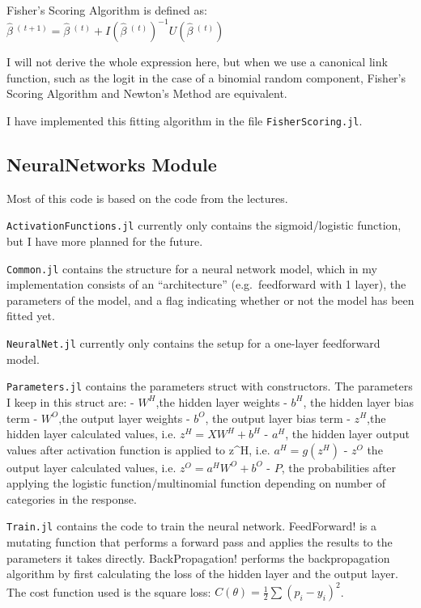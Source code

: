 \documentclass[]{article}
\begin{document}
Fisher's Scoring Algorithm is defined as:
\(\hat{\beta}\ ^{(\ t + 1)} = \hat{\beta}\ ^{(\ t)} +I(\hat{\beta}\ ^{(\ t)})^{-1}U(\hat{\beta}\ ^{(\ t)})\)

I will not derive the whole expression here, but when we use a canonical
link function, such as the logit in the case of a binomial random
component, Fisher's Scoring Algorithm and Newton's Method are
equivalent.

I have implemented this fitting algorithm in the file
\texttt{FisherScoring.jl}.

\subsection{NeuralNetworks Module}\label{neuralnetworks-module}

Most of this code is based on the code from the lectures.

\texttt{ActivationFunctions.jl} currently only contains the
sigmoid/logistic function, but I have more planned for the future.

\texttt{Common.jl} contains the structure for a neural network model,
which in my implementation consists of an ``architecture''
(e.g.~feedforward with 1 layer), the parameters of the model, and a flag
indicating whether or not the model has been fitted yet.

\texttt{NeuralNet.jl} currently only contains the setup for a one-layer
feedforward model.

\texttt{Parameters.jl} contains the parameters struct with constructors.
The parameters I keep in this struct are: - \(W^H\),the hidden layer
weights - \(b^H\), the hidden layer bias term - \(W^O\),the output layer
weights - \(b^O\), the output layer bias term - \(z^H\),the hidden layer
calculated values, i.e. \(z^H = XW^H + b^H\) - \(a^H\), the hidden layer
output values after activation function is applied to z\^{}H, i.e.
\(a^H = g(z^H)\) - \(z^O\) the output layer calculated values, i.e.
\(z^O = a^HW^O + b^O\) - \(P\), the probabilities after applying the
logistic function/multinomial function depending on number of categories
in the response.

\texttt{Train.jl} contains the code to train the neural network.
FeedForward! is a mutating function that performs a forward pass and
applies the results to the parameters it takes directly.
BackPropagation! performs the backpropagation algorithm by first
calculating the loss of the hidden layer and the output layer. The cost
function used is the square loss:
\(C(\theta) = \frac{1}{2}\sum (p_i - y_i)^2\).
\end{document}

